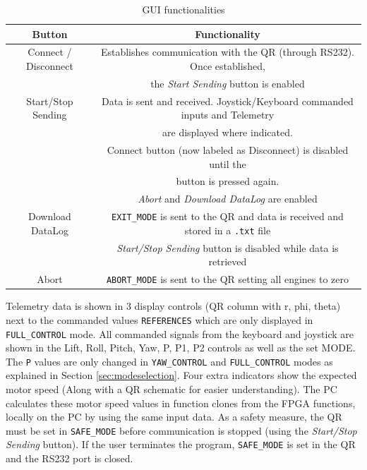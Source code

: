 \documentclass{article}
\begin{document}
\begin{table}[ht]
\centering
\begin{tabular}{|c|c|}
\hline 
\textbf{Button} & \textbf{Functionality} \\ 
\hline 
\hline 
Connect / Disconnect & Establishes communication with the QR (through RS232). Once established, \\ & the \emph{Start Sending} button is enabled\\ 
\hline 
Start/Stop Sending & Data is sent and received. Joystick/Keyboard commanded inputs and Telemetry \\ & are displayed  where indicated. 
\\ & Connect button (now labeled as Disconnect) is disabled until the \\ & button is pressed again.
\\ & \emph{Abort} and \emph{Download DataLog} are enabled
\\
\hline 
Download DataLog & \texttt{EXIT\_MODE} is sent to the QR and data is received and stored in a \texttt{.txt} file
\\ & \emph{Start/Stop Sending} button is disabled while data is retrieved\\
\hline 
Abort & \texttt{ABORT\_MODE} is sent to the QR setting all engines to zero\\ 
\hline 
\end{tabular} 
\caption{GUI functionalities}
\label{tbl:GUIButts}
\end{table}

Telemetry data is shown in 3 display controls (QR column with r, phi, theta) next to the commanded values \texttt{REFERENCES} which are only displayed in \texttt{FULL\_CONTROL} mode. All commanded signals from the keyboard and joystick are shown in the Lift, Roll, Pitch, Yaw, P, P1, P2 controls as well as the set MODE. The \texttt{P} values are only changed in \texttt{YAW\_CONTROL} and \texttt{FULL\_CONTROL} modes as explained in Section \ref{sec:modeselection}. Four extra indicators show the expected motor speed (Along with a QR schematic for easier understanding). The PC calculates these motor speed values in function clones from the FPGA functions, locally on the PC by using the same input data. As a safety measure, the QR must be set in \texttt{SAFE\_MODE} before communication is stopped (using the \emph{Start/Stop Sending} button). If the user terminates the program, \texttt{SAFE\_MODE} is set in the QR and the RS232 port is closed.

\end{document}
